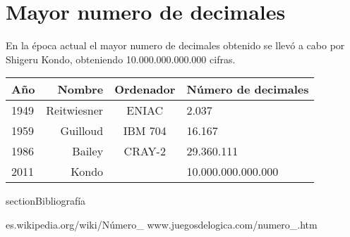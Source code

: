 \documentclass[12pt,a4paper]{article}
\begin{document}
\section{Mayor numero de decimales}
En la época actual el mayor numero de decimales obtenido se llevó a cabo por Shigeru Kondo, obteniendo 10.000.000.000.000 cifras.
\begin{table}{}
\begin{tabular}{lrcl}
Año & Nombre & Ordenador & Número de decimales \\ \hline
1949 & Reitwiesner & ENIAC & 2.037 \\ \hline
1959 & Guilloud & IBM 704 & 16.167 \\ \hline
1986 & Bailey & CRAY-2 & 29.360.111 \\ \hline
2011 & Kondo & & 10.000.000.000.000 \\ \hline
\end{tabular}
\end {table}
section{Bibliografía}
\begin{itemize}
  es.wikipedia.org/wiki/Número\_\pi \hline
     www.juegosdelogica.com/numero\_\pi.htm
\end{itemize}
\end{document}

